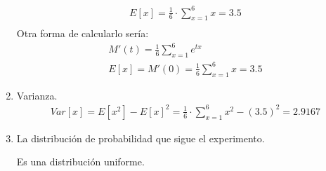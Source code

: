 \begin{ejercicio}
\begin{enumerate}[label=\alph*)]
        \begin{gather*}
            E[x] = \frac{1}{6} \cdot \sum\limits_{x=1}^6 x = 3.5\\
        \end{gather*}
        Otra forma de calcularlo sería:
        \begin{gather*}
            M'(t)= \frac{1}{6} \sum\limits_{x= 1}^6 e^{tx}\\
            E[x] = M'(0) =\frac{1}{6} \sum\limits_{x=1}^6 x = 3.5
        \end{gather*}
        \item Varianza.
         \begin{gather*}
            Var[x]=E[x^2]-E[x]^2 = \frac{1}{6} \cdot \sum\limits_{x=1}^6 x^2 - (3.5)^2 = 2.9167
         \end{gather*}
        \item La distribución de probabilidad que sigue el experimento.
        
        Es una distribución uniforme.
    \end{enumerate} 
\end{ejercicio}

